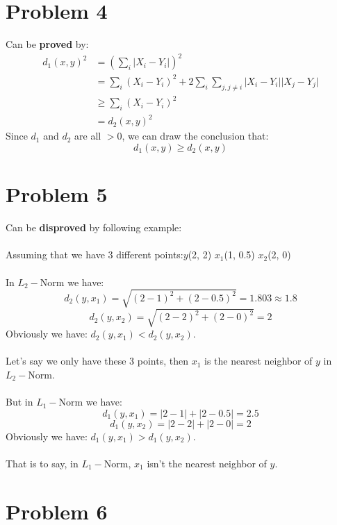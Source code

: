 \documentclass[12pt]{scrartcl}
\begin{document}
  \section*{Problem 4}  

Can be \textbf{proved} by:
\begin{equation*}
  \begin{aligned}
    d_1(x, y)^2 &= \left( \sum_{i}\lvert X_i - Y_i \rvert \right)^2 \\
                &= \sum_{i}(X_i - Y_i)^2 + 2\sum_{i}\sum_{j, j \neq i} \lvert X_i - Y_i \rvert\lvert X_j - Y_j \rvert\\
                &\geq \sum_{i}(X_i - Y_i)^2 \\
                &=d_2(x, y)^2\
  \end{aligned}
\end{equation*}
Since $d_1$ and $d_2$ are all $>0$, we can draw the conclusion that:
\[d_1(x, y) \geq d_2(x, y)\]
  \section*{Problem 5}
 
Can be \textbf{disproved} by following example:
\\
\\
Assuming that we have 3 different points:\quad $y$(2, 2) \quad $x_1$(1, 0.5) \quad $x_2$(2, 0)
\\
\\
In $L_2-$Norm we have:
\[ d_2(y, x_1) = \sqrt{(2-1)^2 + (2-0.5)^2} = 1.803 \approx 1.8    \]
\[ d_2(y, x_2) = \sqrt{(2-2)^2 + (2-0)^2} = 2     \]
Obviously we have: $d_2(y, x_1) < d_2(y, x_2)$.
\\
\\
Let's say we only have these 3 points, then 
$x_1$ is the nearest neighbor of $y$ in $L_2-$Norm.
\\
\\
But in $L_1-$Norm we have:
\[ d_1(y, x_1) = \lvert 2 - 1 \rvert + \lvert 2 - 0.5 \rvert = 2.5    \]
\[ d_1(y, x_2) = \lvert 2 - 2 \rvert + \lvert 2 - 0 \rvert = 2    \]
Obviously we have: $d_1(y, x_1) > d_1(y, x_2)$.
\\
\\
That is to say, in $L_1-$Norm, $x_1$ isn't the nearest neighbor of $y$.

\section*{Problem 6}
\end{document}
